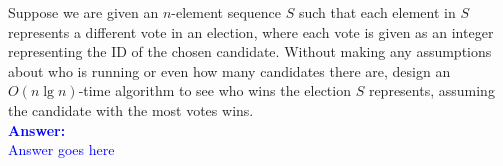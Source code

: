 \item{}
Suppose we are given an $n$-element sequence $S$ such that each element in $S$
represents a different vote in an election, where each vote is given as an
integer representing the ID of the chosen candidate. Without making any
assumptions about who is running or even how many candidates there are, design
an $O(n\lg n)$-time algorithm to see who wins the election $S$ represents,
assuming the candidate with the most votes wins.\\[12pt]
\ifanswers
\textcolor{blue}{
\textbf{Answer:}\\[6pt]
Answer goes here
}
\newpage
\fi
